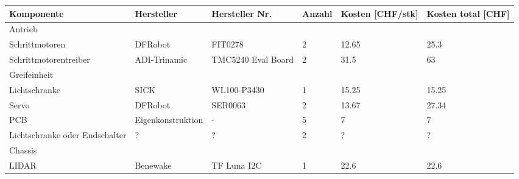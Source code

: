 \documentclass[main.tex]{subfiles} %
\begin{document}
\begin{table}[h]
    \centering
    \scriptsize %
    \begin{tabular}{|p{3cm}|p{3cm}|p{3cm}|p{1cm}|p{1.5cm}|p{1cm}|}
        \hline
        \textbf{Komponente}                    & \textbf{Hersteller} & \textbf{Hersteller Nr.} & \textbf{Anzahl} & \textbf{Kosten [CHF/stk]} & \textbf{Kosten total [CHF]} \\ \hline
        \rowcolor{lightgray} Antrieb           &                     &                         &                 &                           &                             \\ \hline
        Schrittmotoren                         & DFRobot             & FIT0278                 & 2               & 12.65                     & 25.3                          \\ \hline
        Schrittmotorentreiber                  & ADI-Trinamic        & TMC5240 Eval Board      & 2               & 31.5                      & 63                          \\ \hline
        \rowcolor{lightgray} Greifeinheit      &                     &                         &                 &                           &                             \\ \hline
        Lichtschranke                          & SICK                & WL100-P3430             & 1               & 15.25                     & 15.25                       \\ \hline
        Servo                                  & DFRobot             & SER0063                 & 2               & 13.67                     & 27.34                       \\ \hline
        PCB                                    & Eigenkonstruktion   & -                       & 5               & 7                         & 7                           \\ \hline
        Lichtschranke oder Endschalter         & ?                   & ?                       & 2               & ?                         & ?                           \\ \hline
        \rowcolor{lightgray} Chassis           &                     &                         &                 &                           &                             \\ \hline
        LIDAR                                  & Benewake            & TF Luna I2C             & 1               & 22.6                      & 22.6                        \\ \hline

\end{tabular}
\end{table}
\end{document}

